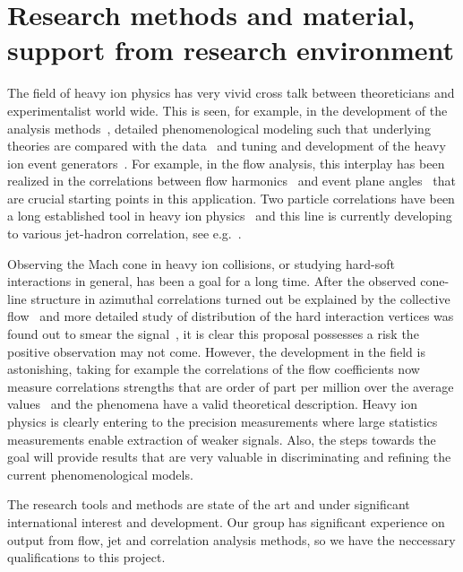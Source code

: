 \section{Research methods and material, support from research environment} %
\label{sec:researchmethods}

The field of heavy ion physics has very vivid cross talk between theoreticians and experimentalist world wide. This is seen, for example, in the development of the analysis methods~\cite{Poskanzer:1998yz,Bilandzic:2010jr}, detailed phenomenological modeling such that underlying theories are compared with the data~\cite{Burke:2013yra,Renk:2011gj,Niemi:2015qia} and tuning and development of the heavy ion event generators~\cite{Gyulassy:1994ew,Lin:2004en,Lokhtin2006}. For example, in the flow analysis, this interplay has been realized in the correlations between flow harmonics~\cite{Poskanzer:1998yz,ALICE:2011ab} and event plane angles~\cite{Aad:2014fla,Bhalerao:2014xra} that are crucial starting points in this application. Two particle correlations have been a long established tool in heavy ion physics~\cite{PhysRevLett.95.152301,PhysRevLett.97.052301} and this line is currently developing to various jet-hadron correlation, see e.g.~\cite{Khachatryan:2016tfj}. 

Observing the Mach cone in heavy ion collisions, or studying hard-soft interactions in general, has been a goal for a long time. After the observed cone-line structure in azimuthal correlations turned out be explained by the collective flow~\cite{ALICE:2011ab} and more detailed study of distribution of the hard interaction vertices was found out to smear the signal~\cite{Tachibana:2015qxa}, it is clear this proposal possesses a risk the positive observation may not come. However, the development in the field is astonishing, taking for example the correlations of the flow coefficients now measure correlations strengths that are order of part per million over the average values~\cite{ALICE:2016kpq} and the phenomena have a valid theoretical description. Heavy ion physics is clearly entering to the precision measurements where large statistics measurements enable extraction of weaker signals. Also, the steps towards the goal will provide results that are very valuable in discriminating and refining the current phenomenological models.

The research tools and methods are state of the art and under significant international interest and development. Our group has significant experience on output from flow, jet and correlation analysis methods, so we have the neccessary qualifications to this project.

